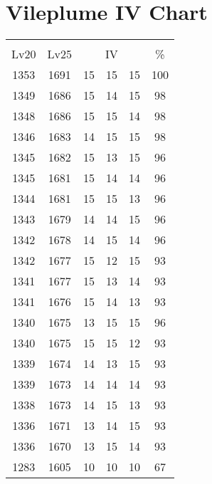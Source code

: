 \documentclass{article}%
\begin{document}
%
\normalsize%
\section{Vileplume IV Chart}%
\label{sec:Vileplume IV Chart}%
\renewcommand{\arraystretch}{1.5}%
\begin{tabular}{|c|c|c|c|c|c|}%
\hline%
\multicolumn{6}{|c|}{\textcolor{white}{ 
\linebreak{Vileplume}
}%
\cellcolor{black}}\\%
\multicolumn{1}{|c}{Lv20}&\multicolumn{1}{c|}{Lv25}&\multicolumn{3}{c|}{IV}&\multicolumn{1}{|c|}{\%}\\%
\hline%
\rowcolor{color100}%
1353&1691&15&15&15&100\\%
\hline%
\rowcolor{color98}%
1349&1686&15&14&15&98\\%
\hline%
\rowcolor{color98}%
1348&1686&15&15&14&98\\%
\hline%
\rowcolor{color98}%
1346&1683&14&15&15&98\\%
\hline%
\rowcolor{color96}%
1345&1682&15&13&15&96\\%
\hline%
\rowcolor{color96}%
1345&1681&15&14&14&96\\%
\hline%
\rowcolor{color96}%
1344&1681&15&15&13&96\\%
\hline%
\rowcolor{color96}%
1343&1679&14&14&15&96\\%
\hline%
\rowcolor{color96}%
1342&1678&14&15&14&96\\%
\hline%
\rowcolor{color93}%
1342&1677&15&12&15&93\\%
\hline%
\rowcolor{color93}%
1341&1677&15&13&14&93\\%
\hline%
\rowcolor{color93}%
1341&1676&15&14&13&93\\%
\hline%
\rowcolor{color96}%
1340&1675&13&15&15&96\\%
\hline%
\rowcolor{color93}%
1340&1675&15&15&12&93\\%
\hline%
\rowcolor{color93}%
1339&1674&14&13&15&93\\%
\hline%
\rowcolor{color93}%
1339&1673&14&14&14&93\\%
\hline%
\rowcolor{color93}%
1338&1673&14&15&13&93\\%
\hline%
\rowcolor{color93}%
1336&1671&13&14&15&93\\%
\hline%
\rowcolor{color93}%
1336&1670&13&15&14&93\\%
\hline%
\rowcolor{color91}%
1283&1605&10&10&10&67\\%
\end{tabular}

%
\end{document}
